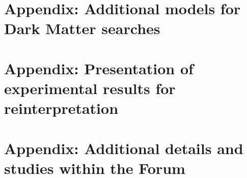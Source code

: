 \documentclass[a4paper,debug,notitlepage,nobib]{tufte-book}
\begin{document}
\appendix

%

\chapter{Appendix: Additional models for Dark Matter searches}
\label{app:EWSpecificModels_Appendix}


\chapter{Appendix: Presentation of experimental results for reinterpretation}
\label{app:Presentation_Of_Experimental_Results}


\chapter{Appendix: Additional details and studies within the Forum}
\label{app:Additional_details}


% 
% 
%
%
%
% 
\printbibliography
\end{document}
